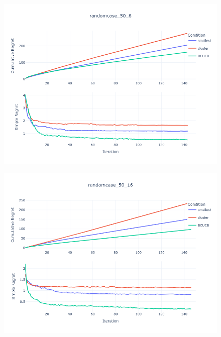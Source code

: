 \documentclass[opre,sglanonrev]{informs4}
\begin{document}
\begin{figure}[htbp]
\begin{minipage}[t]{0.48\textwidth}
        \includegraphics[width=\textwidth]{figures/random_50_8.png}
        \label{}
    \end{minipage}
    \hfill
    \begin{minipage}[t]{0.48\textwidth}
        \centering
        \includegraphics[width=\textwidth]{figures/random_50_16.png}
        \label{}
    \end{minipage}
\end{figure}



 
 
\end{document}
